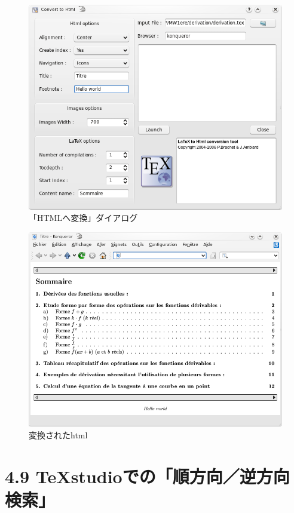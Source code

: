 \documentclass[]{book}
\makeatletter
\def\maxwidth{\ifdim\Gin@nat@width>\linewidth\linewidth
\else\Gin@nat@width\fi}
\let\Oldincludegraphics\includegraphics
\renewcommand{\includegraphics}[1]{\Oldincludegraphics[width=\maxwidth]{#1}}
\makeatother
\begin{document}
\begin{figure}[htbp]
\centering
\includegraphics{doc18.png}
\caption{「HTMLへ変換」ダイアログ}
\end{figure}

\begin{figure}[htbp]
\centering
\includegraphics{doc19.png}
\caption{変換されたhtml}
\end{figure}

\section{4.9 TeXstudioでの「順方向／逆方向検索」}
\end{document}
